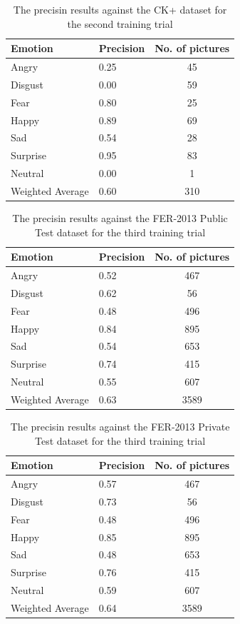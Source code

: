 \documentclass[runningheads,a4paper,11pt]{report}
\begin{document}
\begin{table}[htbp]
	\caption{The precisin results against the CK+ dataset for the second training trial}
	\label{fer_training_28k_001_ckp}
		\begin{center}
			\begin{tabular}{p{110pt}p{110pt}c}
				\textbf{Emotion}& \textbf{Precision}& \textbf{No. of pictures} \\
				\hline\hline
				Angry& 0.25& 45 \\
				Disgust& 0.00& 59 \\
				Fear& 0.80& 25 \\
				Happy& 0.89& 69 \\
				Sad& 0.54& 28 \\
				Surprise& 0.95& 83 \\
				Neutral& 0.00& 1 \\
				\hline
				Weighted Average& 0.60& 310
			\end{tabular}
		\end{center}
\end{table}
\begin{table}[htbp]
	\caption{The precisin results against the FER-2013 Public Test dataset for the third training trial}
	\label{fer_training_28k_001_public_test}
		\begin{center}
			\begin{tabular}{p{110pt}p{110pt}c}
				\textbf{Emotion}& \textbf{Precision}& \textbf{No. of pictures} \\
				\hline\hline
				Angry& 0.52& 467 \\
				Disgust& 0.62& 56 \\
				Fear& 0.48& 496 \\
				Happy& 0.84& 895 \\
				Sad& 0.54& 653 \\
				Surprise& 0.74& 415 \\
				Neutral& 0.55& 607 \\
				\hline
				Weighted Average& 0.63 &3589
			\end{tabular}
		\end{center}
\end{table}
\begin{table}[htbp]
	\caption{The precisin results against the FER-2013 Private Test dataset for the third training trial}
	\label{fer_training_28k_001_private_test}
		\begin{center}
			\begin{tabular}{p{110pt}p{110pt}c}
				\textbf{Emotion}& \textbf{Precision}& \textbf{No. of pictures} \\
				\hline\hline
				Angry& 0.57& 467 \\
				Disgust& 0.73& 56 \\
				Fear& 0.48& 496 \\
				Happy& 0.85& 895 \\
				Sad& 0.48& 653 \\
				Surprise& 0.76& 415 \\
				Neutral& 0.59& 607 \\
				\hline
				Weighted Average& 0.64 &3589
			\end{tabular}
		\end{center}
\end{table}
\end{document}
